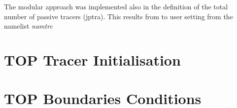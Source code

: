 \documentclass[../main/TOP_manual]{subfiles}
\begin{document}
The modular approach was implemented also in the definition of the total number of passive tracers (jptra). This results from to user setting from the namelist \textit{namtrc}

\section{ TOP Tracer Initialisation}

\section{ TOP Boundaries Conditions}
\end{document}
